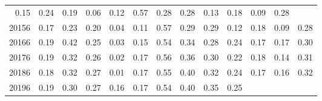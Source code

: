 \begin{table}[!h]
\begin{tabular}{lllllllllllll}
  \multicolumn{1}{|r}{0.15} &
  \multicolumn{1}{r}{0.24} &
  \multicolumn{1}{r}{0.19} &
  \multicolumn{1}{r}{0.06} &
  \multicolumn{1}{r}{0.12} &
  \multicolumn{1}{r}{0.57} &
  \multicolumn{1}{r}{0.28} &
  \multicolumn{1}{r}{0.28} &
  \multicolumn{1}{r}{0.13} &
  \multicolumn{1}{r}{0.18} &
  \multicolumn{1}{r}{0.09} &
  \multicolumn{1}{r}{0.28} \\
\multicolumn{1}{l}{\hspace{1em}20156} &
  \multicolumn{1}{|r}{0.17} &
  \multicolumn{1}{r}{0.23} &
  \multicolumn{1}{r}{0.20} &
  \multicolumn{1}{r}{0.04} &
  \multicolumn{1}{r}{0.11} &
  \multicolumn{1}{r}{0.57} &
  \multicolumn{1}{r}{0.29} &
  \multicolumn{1}{r}{0.29} &
  \multicolumn{1}{r}{0.12} &
  \multicolumn{1}{r}{0.18} &
  \multicolumn{1}{r}{0.09} &
  \multicolumn{1}{r}{0.28} \\
\multicolumn{1}{l}{\hspace{1em}20166} &
  \multicolumn{1}{|r}{0.19} &
  \multicolumn{1}{r}{0.42} &
  \multicolumn{1}{r}{0.25} &
  \multicolumn{1}{r}{0.03} &
  \multicolumn{1}{r}{0.15} &
  \multicolumn{1}{r}{0.54} &
  \multicolumn{1}{r}{0.34} &
  \multicolumn{1}{r}{0.28} &
  \multicolumn{1}{r}{0.24} &
  \multicolumn{1}{r}{0.17} &
  \multicolumn{1}{r}{0.17} &
  \multicolumn{1}{r}{0.30} \\
\multicolumn{1}{l}{\hspace{1em}20176} &
  \multicolumn{1}{|r}{0.19} &
  \multicolumn{1}{r}{0.32} &
  \multicolumn{1}{r}{0.26} &
  \multicolumn{1}{r}{0.02} &
  \multicolumn{1}{r}{0.17} &
  \multicolumn{1}{r}{0.56} &
  \multicolumn{1}{r}{0.36} &
  \multicolumn{1}{r}{0.30} &
  \multicolumn{1}{r}{0.22} &
  \multicolumn{1}{r}{0.18} &
  \multicolumn{1}{r}{0.14} &
  \multicolumn{1}{r}{0.31} \\
\multicolumn{1}{l}{\hspace{1em}20186} &
  \multicolumn{1}{|r}{0.18} &
  \multicolumn{1}{r}{0.32} &
  \multicolumn{1}{r}{0.27} &
  \multicolumn{1}{r}{0.01} &
  \multicolumn{1}{r}{0.17} &
  \multicolumn{1}{r}{0.55} &
  \multicolumn{1}{r}{0.40} &
  \multicolumn{1}{r}{0.32} &
  \multicolumn{1}{r}{0.24} &
  \multicolumn{1}{r}{0.17} &
  \multicolumn{1}{r}{0.16} &
  \multicolumn{1}{r}{0.32} \\
\multicolumn{1}{l}{\hspace{1em}20196} &
  \multicolumn{1}{|r}{0.19} &
  \multicolumn{1}{r}{0.30} &
  \multicolumn{1}{r}{0.27} &
  \multicolumn{1}{r}{0.16} &
  \multicolumn{1}{r}{0.17} &
  \multicolumn{1}{r}{0.54} &
  \multicolumn{1}{r}{0.40} &
  \multicolumn{1}{r}{0.35} &
  \multicolumn{1}{r}{0.25} &

\end{tabular}
\end{table}

